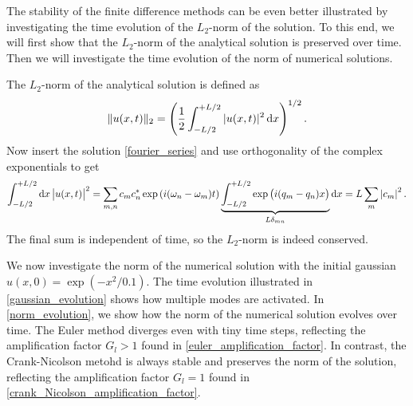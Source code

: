 
The stability of the finite difference methods can be even better illustrated by investigating the time evolution of the $L_2$-norm of the solution.
To this end, we will first show that the $L_2$-norm of the analytical solution is preserved over time.
Then we will investigate the time evolution of the norm of numerical solutions.

The $L_2$-norm of the analytical solution is defined as
\begin{equation*}
	\Vert u(x,t) \Vert_2 = \left( \frac{1}{2} \int_{-L/2}^{+L/2} |u(x,t)|^2 \dif x \right)^{1/2}.
\end{equation*}
Now insert the solution \ref{fourier_series} and use orthogonality of the complex exponentials to get
\begin{equation*}
\int_{-L/2}^{+L/2} \dif x \left| u(x,t) \right|^2 = \sum_{m,n} c_m c_n^* \exp{(i(\omega_n-\omega_m)t)} \underbrace{\int_{-L/2}^{+L/2} \exp{\left(i(q_m-q_n)x\right)}}_{L \delta_{m n}} \dif x = L \sum_m \left| c_m \right|^2.
\end{equation*}
The final sum is independent of time, so the $L_2$-norm is indeed conserved.

We now investigate the norm of the numerical solution with the initial gaussian $u(x, 0) = \exp \left( -x^2 / 0.1 \right)$.
The time evolution illustrated in \cref{gaussian_evolution} shows how multiple modes are activated.
In \cref{norm_evolution}, we show how the norm of the numerical solution evolves over time.
The Euler method diverges even with tiny time steps, reflecting the amplification factor $G_l > 1$ found in \cref{euler_amplification_factor}.
In contrast, the Crank-Nicolson metohd is always stable and preserves the norm of the solution, reflecting the amplification factor $G_l = 1$ found in \cref{crank_Nicolson_amplification_factor}.

